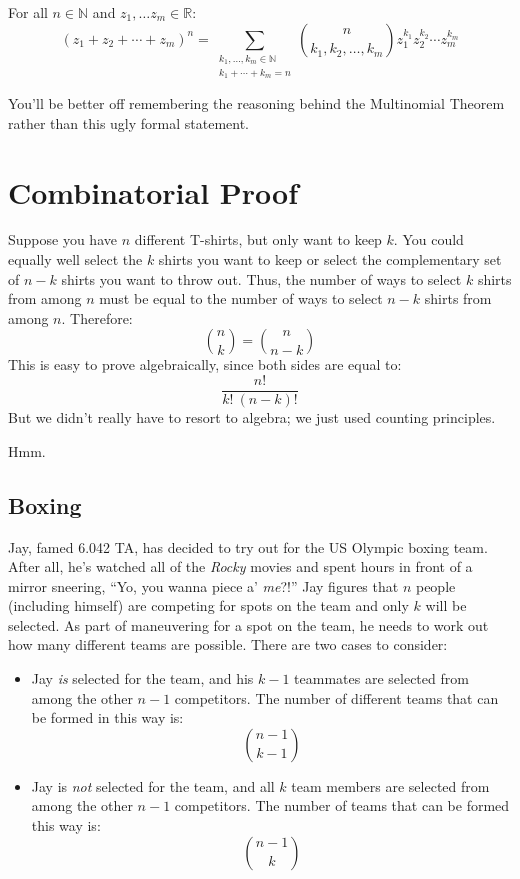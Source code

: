 \begin{theorem}
For all $n \in \mathbb{N}$ and $z_1, \dots z_m \in \mathbb{R}$:
\[
(z_1 + z_2 + \cdots + z_m)^n =
   \sum_{\substack{k_1, \dots, k_m \in \mathbb{N} \\
                   k_1 + \cdots + k_m = n}}
   \binom{n}{k_1, k_2, \dots, k_m} z_1^{k_1} z_2^{k_2} \cdots z_m^{k_m} 
\]
\end{theorem}
You'll be better off remembering the reasoning behind the Multinomial
Theorem rather than this ugly formal statement.


\section{Combinatorial Proof}\label{combinatorial_proof_sec}

Suppose you have $n$ different T-shirts, but only want to keep $k$.
You could equally well select the $k$ shirts you want to keep or
select the complementary set of $n - k$ shirts you want to throw out.
Thus, the number of ways to select $k$ shirts from among $n$ must be
equal to the number of ways to select $n - k$ shirts from among $n$.
Therefore:
%
\[
\binom{n}{k} = \binom{n}{n-k}
\]
%
This is easy to prove algebraically, since both sides are equal to:
%
\[
\frac{n!}{k!\ (n-k)!}
\]
%
But we didn't really have to resort to algebra; we just used counting
principles.

Hmm.

\subsection{Boxing}

Jay, famed 6.042 TA, has decided to try out for the US Olympic
boxing team.  After all, he's watched all of the \emph{Rocky} movies
and spent hours in front of a mirror sneering, ``Yo, you wanna piece
a' \emph{me}?!''  Jay figures that $n$ people (including himself)
are competing for spots on the team and only $k$ will be selected.  As
part of maneuvering for a spot on the team, he needs to work out how
many different teams are possible.  There are two cases to consider:

\begin{itemize}
  
\item Jay \emph{is} selected for the team, and his $k - 1$
  teammates are selected from among the other $n - 1$ competitors.
  The number of different teams that can be formed in this way is:
%
\[
\binom{n-1}{k-1}
\]

\item Jay is \emph{not} selected for the team, and all $k$ team
members are selected from among the other $n - 1$ competitors.  The
number of teams that can be formed this way is:
%
\[
\binom{n - 1}{k}
\]

\end{itemize}

